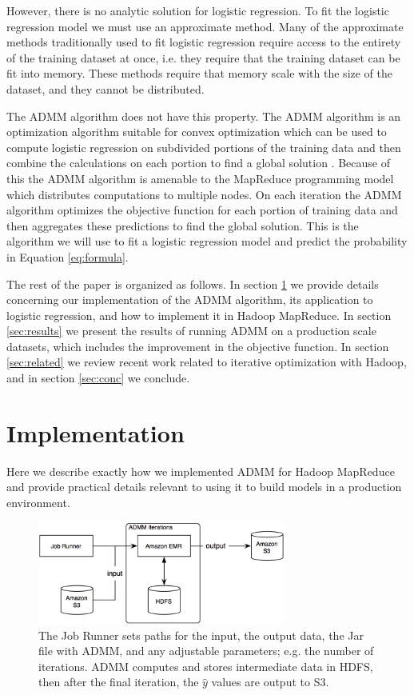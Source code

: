\documentclass[10pt, conference, compsocconf]{IEEEtran}
\begin{document}
However, there is no analytic solution for logistic regression.  To fit the logistic regression model we must use an approximate method.  Many of the approximate methods traditionally used to fit logistic regression require access to the entirety of the training dataset at once, i.e. they require that the training dataset can be fit into memory.  These methods require that memory scale with the size of the dataset, and they cannot be distributed.

The ADMM algorithm does not have this property.  The ADMM algorithm is an optimization algorithm suitable for convex optimization which can be used to compute logistic regression on subdivided portions of the training data and then combine the calculations on each portion to find a global solution \cite{boyd}.  Because of this the ADMM algorithm is amenable to the MapReduce programming model which distributes computations to multiple nodes.  On each iteration the ADMM algorithm optimizes the objective function for each portion of training data and then aggregates these predictions to find the global solution.  This is the algorithm we will use to fit a logistic regression model and predict the probability in Equation \ref{eq:formula}.

The rest of the paper is organized as follows.  In section \ref{sec:imp} we provide details concerning our implementation of the ADMM algorithm, its application to logistic regression, and how to implement it in Hadoop MapReduce.  In section \ref{sec:results} we present the results of running ADMM on a production scale datasets, which includes the improvement in the objective function.  In section \ref{sec:related} we review recent work related to iterative optimization with Hadoop, and in section \ref{sec:conc} we conclude.

\section{Implementation}\label{sec:imp}
Here we describe exactly how we implemented ADMM for Hadoop MapReduce and provide practical details relevant to using it to build models in a production environment.

\begin{figure}[!t]
\centering
\includegraphics[width=3.2in]{aws_implementation}
\caption{The Job Runner sets paths for the input, the output data, the Jar file with ADMM, and any adjustable parameters; e.g. the number of iterations.  ADMM computes and stores intermediate data in HDFS, then after the final iteration, the $\hat{y}$ values are output to S3.}
\label{fig:workflow}
\end{figure}
\end{document}
